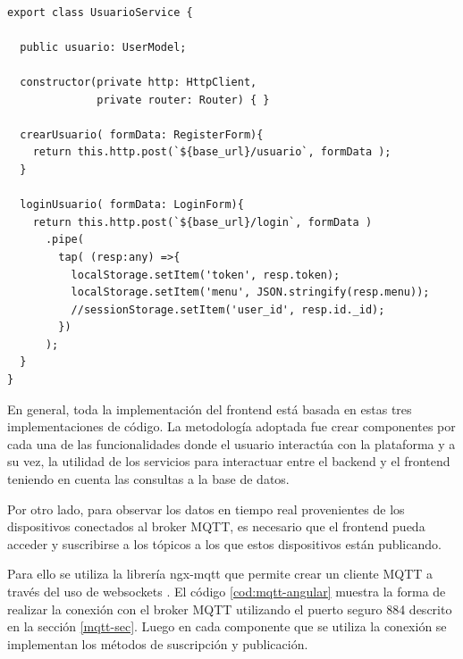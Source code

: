 \begin{lstlisting}[label=cod:service-login,caption=Fragmentos de código más relevantes utilizados en el servicio de usuario.] 

export class UsuarioService {

  public usuario: UserModel;

  constructor(private http: HttpClient,
              private router: Router) { }

  crearUsuario( formData: RegisterForm){
    return this.http.post(`${base_url}/usuario`, formData );
  }
  
  loginUsuario( formData: LoginForm){
    return this.http.post(`${base_url}/login`, formData )
      .pipe(
        tap( (resp:any) =>{
          localStorage.setItem('token', resp.token);
          localStorage.setItem('menu', JSON.stringify(resp.menu));
          //sessionStorage.setItem('user_id', resp.id._id);
        })
      );
  }
}

\end{lstlisting} 

En general, toda la implementación del frontend está basada en estas tres implementaciones de código.  La metodología adoptada fue crear componentes por cada una de las funcionalidades donde el usuario interactúa con la plataforma y a su vez, la utilidad de los servicios para interactuar entre el backend y el frontend teniendo en cuenta las consultas a la base de datos. 

Por otro lado, para observar los datos en tiempo real provenientes de los dispositivos conectados al broker MQTT, es necesario que el frontend pueda acceder y suscribirse a los tópicos a los que estos dispositivos están publicando. 

Para ello se utiliza la librería ngx-mqtt \citep{WEBSITE:41} que permite crear un cliente MQTT a través del uso de websockets \citep{WEBSITE:42}. El código \ref{cod:mqtt-angular} muestra la forma de realizar la conexión con el broker MQTT utilizando el puerto seguro 884 descrito en la sección \ref{mqtt-sec}. Luego en cada componente que se utiliza la conexión se implementan los métodos de suscripción y publicación. 

